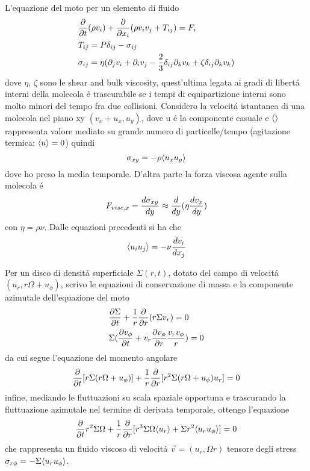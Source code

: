 L'equazione del moto per un elemento di fluido
\begin{align}
&\PDof{t}(\rho v_i)+\PDof{x_i}(\rho v_iv_j+T_{ij})=F_i\\
&T_{ij}=P\delta_{ij}-\sigma_{ij}\\
&\sigma_{ij}=\eta(\partial_jv_i+\partial_iv_j-\frac{2}{3}\delta_{ij}\partial_kv_k+\zeta\delta_{ij}\partial_kv_k)
\end{align}
dove $\eta$, $\zeta$ sono le shear and bulk viscosity, quest'ultima legata ai gradi di libert\'a interni della molecola \'e trascurabile se i tempi di equipartizione interni sono molto minori del tempo fra due collisioni.
Considero la velocit\'a istantanea di una molecola nel piano xy $(v_x+u_x,u_y)$, dove u \'e la componente casuale e $\exv{}$ rappresenta valore mediato su grande numero di particelle/tempo (agitazione termica: $\exv{u}=0$) quindi
\begin{equation}
\sigma_{xy}=-\rho\exv{u_xu_y}
\end{equation}
dove ho preso la media temporale.
D'altra parte la forza viscosa agente sulla molecola \'e
\begin{equation}
F_{visc,x}=\TDy{y}{\sigma_{xy}}\approx\TDof{y}(\eta\TDy{y}{v_x})
\end{equation}
con $\eta=\rho\nu$.
Dalle equazioni precedenti si ha che
\begin{equation}
\exv{u_iu_j}=-\nu\TDy{x_j}{v_i}
\end{equation}

Per un disco di densit\'a superficiale $\Sigma(r,t)$, dotato del campo di velocit\'a $(u_r,r\Omega+u_{\phi})$, scrivo le equazioni di conservazione di massa e la componente azimutale dell'equazione del moto
\begin{align}
&\PDy{t}{\Sigma}+\frac{1}{r}\PDof{r}(r\Sigma v_r)=0\\
&\Sigma(\PDy{t}{v_{\phi}}+v_r\PDy{r}{v_{\phi}}\frac{v_rv_{\phi}}{r})=0
\end{align}
da cui segue l'equazione del momento angolare
\begin{equation}
\PDof{t}[r\Sigma(r\Omega+u_{\phi})]+\frac{1}{r}\PDof{r}[r^2\Sigma(r\Omega+u_{\phi})u_r]=0
\end{equation}
infine, mediando le fluttuazioni su scala spaziale opportuna e trascurando la fluttuazione azimutale nel termine di derivata temporale, ottengo l'equazione
\begin{equation}
\PDof{t}r^2\Sigma\Omega+\frac{1}{r}\PDof{r}[r^3\Sigma\Omega\exv{u_r}+\Sigma r^2\exv{u_ru_{\phi}}]=0
\end{equation}
che rappresenta un fluido viscoso di velocit\'a $\vec{v}=(u_r,\Omega r)$ tensore degli stress $\sigma_{r\phi}=-\Sigma\exv{u_ru_{\phi}}$.

